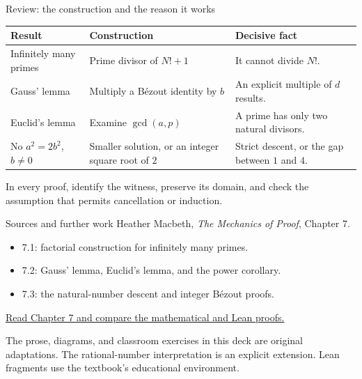 \begin{frame}{Review: the construction and the reason it works}
\begin{center}
\begin{tabular}{p{}p{}p{}}
\toprule
Result & Construction & Decisive fact\\\midrule
Infinitely many primes & Prime divisor of $N!+1$ & It cannot divide $N!$.\\[2mm]
Gauss' lemma & Multiply a B\'ezout identity by $b$ & An explicit multiple of $d$ results.\\[2mm]
Euclid's lemma & Examine $\gcd(a,p)$ & A prime has only two natural divisors.\\[2mm]
No $a^2=2b^2$, $b\ne0$ & Smaller solution, or an integer square root of $2$ & Strict descent, or the gap between $1$ and $4$.\\\bottomrule
\end{tabular}
\end{center}
In every proof, identify the witness, preserve its domain, and check the assumption that permits cancellation or induction.
\end{frame}

\begin{frame}{Sources and further work}
Heather Macbeth, \emph{The Mechanics of Proof}, Chapter 7.
\begin{itemize}
\item 7.1: factorial construction for infinitely many primes.
\item 7.2: Gauss' lemma, Euclid's lemma, and the power corollary.
\item 7.3: the natural-number descent and integer B\'ezout proofs.
\end{itemize}
\medskip
\href{https://hrmacbeth.github.io/math2001/07_Number_Theory.html}{Read Chapter 7 and compare the mathematical and Lean proofs.}
\medskip

The prose, diagrams, and classroom exercises in this deck are original adaptations. The rational-number interpretation is an explicit extension. Lean fragments use the textbook's educational environment.
\end{frame}

